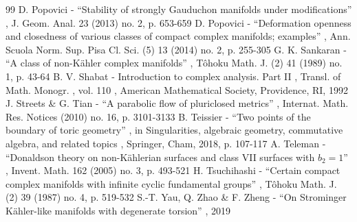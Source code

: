 \documentclass[11pt]{article}
\theoremstyle{definition}
\begin{document}
\begin{thebibliography}{99}
 D. Popovici - “Stability of strongly Gauduchon manifolds under modifications” , J. Geom. Anal. 23 (2013) no. 2, p. 653-659
 D. Popovici - “Deformation openness and closedness of various classes of compact complex manifolds; examples” , Ann. Scuola Norm. Sup. Pisa Cl. Sci. (5) 13 (2014) no. 2, p. 255-305
 G. K. Sankaran - “A class of non-Kähler complex manifolds” , Tôhoku Math. J. (2) 41 (1989) no. 1, p. 43-64
 B. V. Shabat - Introduction to complex analysis. Part II , Transl. of Math. Monogr. , vol. 110 , American Mathematical Society, Providence, RI, 1992
 J. Streets \& G. Tian - “A parabolic flow of pluriclosed metrics” , Internat. Math. Res. Notices (2010) no. 16, p. 3101-3133
 B. Teissier - “Two points of the boundary of toric geometry” , in Singularities, algebraic geometry, commutative algebra, and related topics , Springer, Cham, 2018, p. 107-117
 A. Teleman - “Donaldson theory on non-Kählerian surfaces and class VII surfaces with $b_2=1$” , Invent. Math. 162 (2005) no. 3, p. 493-521
 H. Tsuchihashi - “Certain compact complex manifolds with infinite cyclic fundamental groups” , Tôhoku Math. J. (2) 39 (1987) no. 4, p. 519-532
 S.-T. Yau, Q. Zhao \& F. Zheng - “On Strominger Kähler-like manifolds with degenerate torsion” , 2019
\end{thebibliography}
\end{document}
